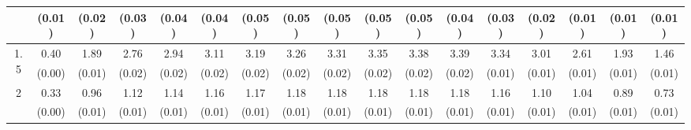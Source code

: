 \documentclass[12pt]{article}  %
\theoremstyle{plain}
\begin{document}
\begin{sidewaystable}[htbp]
\begin{tabular}{ccccccccccccccccc}
                       & (0.01)&   (0.02)& (0.03)& (0.04)& (0.04)& (0.05)& (0.05)& (0.05)& (0.05)&  (0.05)&  (0.04)&  (0.03)&  (0.02)& (0.01)& (0.01)& (0.01)\\ \hline                                                                                                                                                                                                                                                                                    
\multirow{2}{*}{1.5}  &  0.40& 1.89 & 2.76 & 2.94  & 3.11   &3.19   &3.26  & 3.31 &  3.35 &  3.38 & 3.39 & 3.34 & 3.01 & 2.61 & 1.93 & 1.46\\
                      &  (0.00)&   (0.01)& (0.02)& (0.02)& (0.02)& (0.02)& (0.02)& (0.02)& (0.02)&  (0.02)&  (0.02)&  (0.01)&  (0.01)&  (0.01)& (0.01)& (0.01)\\ \hline                                                                                                                                                                                                                                                                                    
\multirow{2}{*}{2}  &0.33 &0.96 & 1.12&  1.14  & 1.16  & 1.17  & 1.18 &  1.18  & 1.18 &  1.18&  1.18 & 1.16 & 1.10 & 1.04 & 0.89 & 0.73
\\
                      &  (0.00)& (0.01)& (0.01)& (0.01)& (0.01)& (0.01)& (0.01)& (0.01)& (0.01)&  (0.01)&  (0.01)&  (0.01)&  (0.01)&  (0.01)&  (0.01)  &     (0.01)\\ \hline                                                                                                                                                                                                                                                                                    
\end{tabular}
\end{sidewaystable}
\end{document}
